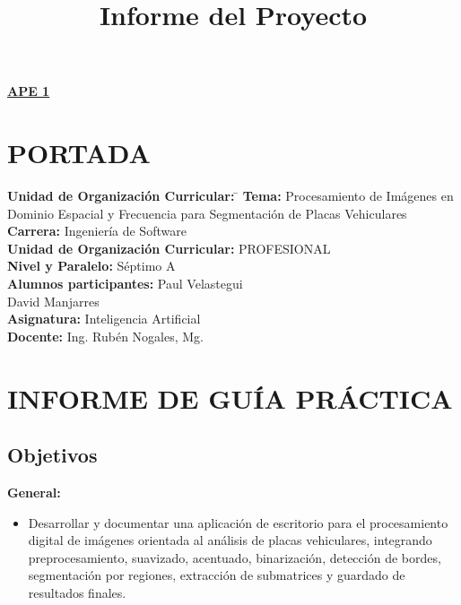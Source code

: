 \documentclass[11pt]{article}
\title{Informe del Proyecto}
\begin{document}
\renewcommand{\figurename}{Figura}
\renewcommand{\tablename}{Tabla}
\renewcommand{\thesection}{\Roman{section}}
\begin{center}
    \textbf{\underline{\normalsize APE 1}}
\end{center}

\section{PORTADA}

\begin{tabbing}
    \textbf{Unidad de Organización Curricular:}\hspace{1cm} \= \kill
    \textbf{Tema:} \> Procesamiento de Imágenes en Dominio Espacial y Frecuencia para Segmentación de Placas Vehiculares \\[0.25em]
    \textbf{Carrera:} \> Ingeniería de Software \\[0.25em]
    \textbf{Unidad de Organización Curricular:} \> PROFESIONAL \\[0.25em]
    \textbf{Nivel y Paralelo:} \> Séptimo A \\[0.25em]
    \textbf{Alumnos participantes:} \> Paul Velastegui \\
    \> David Manjarres \\[0.25em]
    \textbf{Asignatura:} \> Inteligencia Artificial \\[0.25em]
    \textbf{Docente:} \> Ing. Rubén Nogales, Mg.
\end{tabbing}

\section{INFORME DE GUÍA PRÁCTICA}
\renewcommand{\thesection}{\arabic{section}}

\subsection{Objetivos}
\textbf{General:}
\begin{itemize}
    \item Desarrollar y documentar una aplicación de escritorio para el procesamiento digital de imágenes orientada al análisis de placas vehiculares, integrando preprocesamiento, suavizado, acentuado, binarización, detección de bordes, segmentación por regiones, extracción de submatrices y guardado de resultados finales.
\end{itemize}
\end{document}
